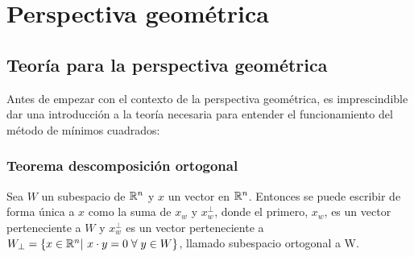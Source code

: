 \section{Perspectiva geométrica}
\subsection{Teoría para la perspectiva geométrica}

Antes de empezar con el contexto de la perspectiva geométrica, es imprescindible dar una introducción a la teoría necesaria para entender el funcionamiento del método de mínimos cuadrados:

\subsubsection{Teorema descomposición ortogonal}

Sea $W$ un subespacio de $\mathbb{R}^n$ y $x$ un vector en $\mathbb{R}^n$. Entonces se puede escribir de forma única a $x$ como la suma de $x_w $ y $x_w^\perp$, donde el primero, $x_w $, es un vector perteneciente a $W$ y $x_w^\perp$ es un vector perteneciente a $W_\perp = \{ x \in \mathbb{R}^n |\ x\cdot y = 0 \; \forall \; y \in W\}$, llamado subespacio ortogonal a W. \\

